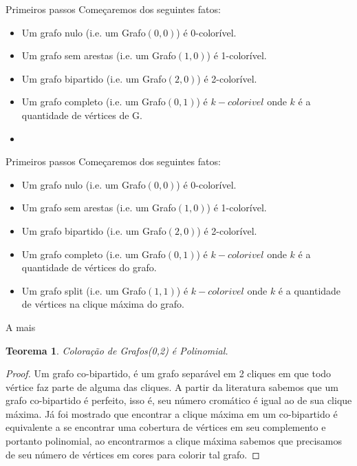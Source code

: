 \documentclass[9pt, compress]{beamer}
\newtheorem{teorema}{Teorema}
\begin{document}
    \begin{frame}{Primeiros passos}
      Começaremos dos seguintes fatos:
      \begin{itemize}
        \item Um grafo nulo (i.e. um Grafo$(0,0)$) é 0-colorível.
        \item Um grafo sem arestas (i.e. um Grafo$(1,0)$) é 1-colorível.
        \item Um grafo bipartido (i.e. um Grafo$(2,0)$) é 2-colorível.
        \item Um grafo completo (i.e. um Grafo$(0,1)$) é $k-colorivel$ onde $k$ é a quantidade de vértices de G.
        \item                                                                                                               
      \end{itemize}
    \end{frame}
    \begin{frame}{Primeiros passos}
      Começaremos dos seguintes fatos:
      \begin{itemize}
        \item Um grafo nulo (i.e. um Grafo$(0,0)$) é 0-colorível.
        \item Um grafo sem arestas (i.e. um Grafo$(1,0)$) é 1-colorível.
        \item Um grafo bipartido (i.e. um Grafo$(2,0)$) é 2-colorível.
        \item Um grafo completo (i.e. um Grafo$(0,1)$) é $k-colorivel$ onde $k$ é a quantidade de vértices do grafo.
        \item Um grafo split (i.e. um Grafo$(1,1)$) é $k-colorivel$ onde $k$ é a quantidade de vértices na clique máxima do grafo.
      \end{itemize}
    \end{frame}
    \begin{frame}{A mais}
      \begin{teorema}
        Coloração de Grafos(0,2) é Polinomial.
     \end{teorema}
     \begin{proof}
      Um grafo co-bipartido, é um grafo separável em 2 cliques em que todo vértice faz parte de alguma das cliques. A partir da literatura sabemos que um grafo co-bipartido é perfeito, isso é, seu número cromático é igual ao de sua clique máxima. 
      Já foi mostrado que encontrar a clique máxima em um co-bipartido é equivalente a se encontrar uma cobertura de vértices em seu complemento e portanto polinomial, ao encontrarmos a clique máxima sabemos que precisamos de seu número de vértices em cores para colorir tal grafo.
     \end{proof}
    \end{frame}
\end{document}
